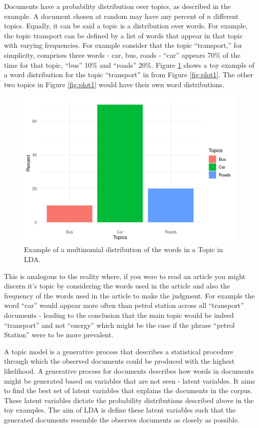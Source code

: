\documentclass[
]{article}
\begin{document}
Documents have a probability distribution over topics, as described in
the example. A document chosen at random may have any percent of \(n\)
different topics. Equally, it can be said a topic is a distribution over
words. For example, the topic transport can be defined by a list of
words that appear in that topic with varying frequencies. For example
consider that the topic ``transport,'' for simplicity, comprises three
words - car, bus, roads - ``car'' appears 70\% of the time for that
topic, ``bus'' 10\% and ``roads'' 20\%. Figure \ref{fig:plot2} shows a
toy example of a word distribution for the topic ``transport'' in from
Figure \ref{fig:plot1}. The other two topics in Figure \ref{fig:plot1}
would have their own word distributions.

\begin{figure}

{\centering \includegraphics[width=0.8\linewidth]{00---Actual-Dissertation---Copy_files/figure-latex/plot2-1} 

}

\caption{Example of a multinomial distribution of the words in a Topic in LDA.}\label{fig:plot2}
\end{figure}

This is analogous to the reality where, if you were to read an article
you might discern it's topic by considering the words used in the
article and also the frequency of the words used in the article to make
the judgment. For example the word ``car'' would appear more often than
petrol station across all ``transport'' documents - leading to the
conclusion that the main topic would be indeed ``transport'' and not
``energy'' which might be the case if the phrase ``petrol Station'' were
to be more prevalent.

A topic model is a generative process that describes a statistical
procedure through which the observed documents could be produced with
the highest likelihood. A generative process for documents describes how
words in documents might be generated based on variables that are not
seen - latent variables. It aims to find the best set of latent
variables that explains the documents in the corpus. These latent
variables dictate the probability distributions described above in the
toy examples. The aim of LDA is define these latent variables such that
the generated documents resemble the observes documents as closely as
possible.
\end{document}
